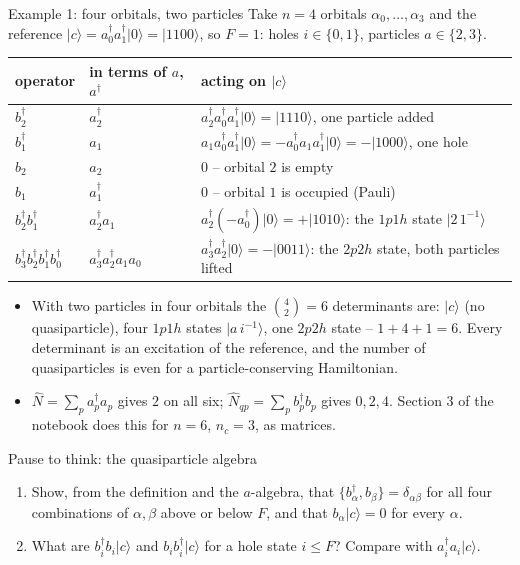 \documentclass[aspectratio=169,10pt]{beamer}
\newcounter{thinkctr}
\newcommand{\thinkq}[2]{%
  \stepcounter{thinkctr}%
  \begin{tcolorbox}[colback=palewarm,colframe=warm,title={\bfseries Pause to think \#\thethinkctr\hfill\mdseries\small(about #1 min -- discuss with your neighbour)},fonttitle=\bfseries]
  #2
  \end{tcolorbox}}
\newcommand{\ket}[1]{\vert #1\rangle}
\begin{document}
\begin{frame}{Example 1: four orbitals, two particles}
  \small
  Take $n=4$ orbitals $\alpha_0,\dots,\alpha_3$ and the reference $\ket{c}=a_0^{\dagger}a_1^{\dagger}\ket{0}=\ket{1100}$, so $F=1$: holes $i\in\{0,1\}$, particles $a\in\{2,3\}$.
  \begin{center}\footnotesize
  \renewcommand{\arraystretch}{1.15}
  \begin{tabular}{lll}
    \toprule
    operator & in terms of $a$, $a^{\dagger}$ & acting on $\ket{c}$\\
    \midrule
    $b_2^{\dagger}$ & $a_2^{\dagger}$ & $a_2^{\dagger}a_0^{\dagger}a_1^{\dagger}\ket{0}=\ket{1110}$, one particle added\\
    $b_1^{\dagger}$ & $a_1$ & $a_1a_0^{\dagger}a_1^{\dagger}\ket{0}=-a_0^{\dagger}a_1a_1^{\dagger}\ket{0}=-\ket{1000}$, one hole\\
    $b_2$ & $a_2$ & $0$ -- orbital $2$ is empty\\
    $b_1$ & $a_1^{\dagger}$ & $0$ -- orbital $1$ is occupied (Pauli)\\
    $b_2^{\dagger}b_1^{\dagger}$ & $a_2^{\dagger}a_1$ & $a_2^{\dagger}(-a_0^{\dagger})\ket{0}=+\ket{1010}$: the $1p1h$ state $\ket{2\,1^{-1}}$\\
    $b_3^{\dagger}b_2^{\dagger}b_1^{\dagger}b_0^{\dagger}$ & $a_3^{\dagger}a_2^{\dagger}a_1a_0$ & $a_3^{\dagger}a_2^{\dagger}\ket{0}=-\ket{0011}$: the $2p2h$ state, both particles lifted\\
    \bottomrule
  \end{tabular}
  \end{center}
  \begin{itemize}
    \item With two particles in four orbitals the $\binom42=6$ determinants are: $\ket{c}$ (no quasiparticle), four $1p1h$ states $\ket{a\,i^{-1}}$, one $2p2h$ state -- $1+4+1=6$. Every determinant is an excitation of the reference, and the number of quasiparticles is even for a particle-conserving Hamiltonian.
    \item $\hat{N}=\sum_pa_p^{\dagger}a_p$ gives $2$ on all six; $\hat{N}_{qp}=\sum_pb_p^{\dagger}b_p$ gives $0,2,4$. Section 3 of the notebook does this for $n=6$, $n_c=3$, as matrices.
  \end{itemize}
\end{frame}

\begin{frame}{Pause to think: the quasiparticle algebra}
  \thinkq{4}{
  \begin{enumerate}
    \item Show, from the definition and the $a$-algebra, that $\{b_\alpha^{\dagger},b_\beta\}=\delta_{\alpha\beta}$ for all four combinations of $\alpha,\beta$ above or below $F$, and that $b_\alpha\ket{c}=0$ for every $\alpha$.
    \item What are $b_i^{\dagger}b_i\ket{c}$ and $b_ib_i^{\dagger}\ket{c}$ for a hole state $i\le F$? Compare with $a_i^{\dagger}a_i\ket{c}$.
  \end{enumerate}}
\end{frame}
\end{document}
